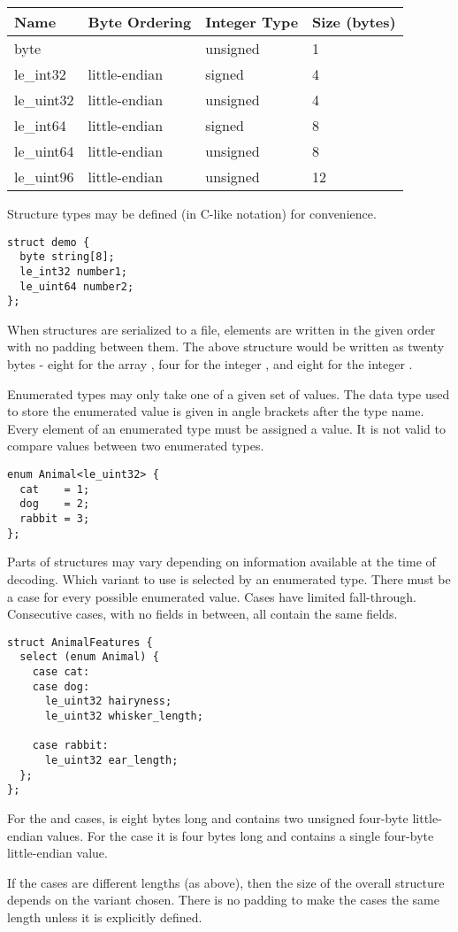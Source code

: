 \begin{center}
\begin{tabular}{l l l l}
\hline
\textbf{Name} & \textbf{Byte Ordering} & \textbf{Integer Type} & \textbf{Size (bytes)} \\
\hline
byte & & unsigned & 1 \\
le\_int32 & little-endian & signed & 4 \\
le\_uint32 & little-endian & unsigned & 4 \\
le\_int64 & little-endian & signed & 8 \\
le\_uint64 & little-endian & unsigned & 8 \\
le\_uint96 & little-endian & unsigned & 12 \\
\end{tabular}
\end{center}

Structure types may be defined (in C-like notation) for convenience.

\begin{verbatim}
struct demo {
  byte string[8];
  le_int32 number1;
  le_uint64 number2;
};
\end{verbatim}

When structures are serialized to a file, elements are written in the given order with no padding between them.
%
The above structure would be written as twenty bytes - eight for the array , four for the integer , and eight for the integer .

Enumerated types may only take one of a given set of values.
%
The data type used to store the enumerated value is given in angle brackets after the type name.
%
Every element of an enumerated type must be assigned a value.
%
It is not valid to compare values between two enumerated types.

\begin{verbatim}
enum Animal<le_uint32> {
  cat    = 1;
  dog    = 2;
  rabbit = 3;
};
\end{verbatim}

Parts of structures may vary depending on information available at the time of decoding.
%
Which variant to use is selected by an enumerated type.
%
There must be a case for every possible enumerated value.
%
Cases have limited fall-through.
%
Consecutive cases, with no fields in between, all contain the same fields.

\begin{verbatim}
struct AnimalFeatures {
  select (enum Animal) {
    case cat:
    case dog:
      le_uint32 hairyness;
      le_uint32 whisker_length;

    case rabbit:
      le_uint32 ear_length;
  };
};
\end{verbatim}

For the  and  cases,  is eight bytes long and contains two unsigned four-byte little-endian values.
%
For the  case it is four bytes long and contains a single four-byte little-endian value.

If the cases are different lengths (as above), then the size of the overall structure depends on the variant chosen.
%
There is no padding to make the cases the same length unless it is explicitly defined.
